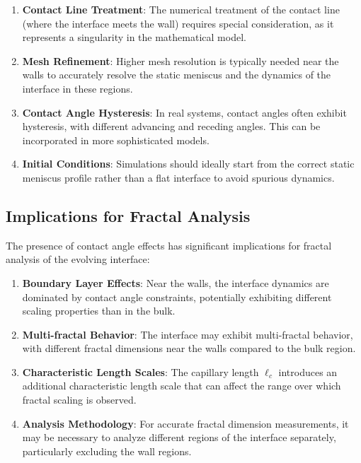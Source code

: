 \documentclass[12pt,a4paper]{article}
\begin{document}
\begin{enumerate}
    \item \textbf{Contact Line Treatment}: The numerical treatment of the contact line (where the interface meets the wall) requires special consideration, as it represents a singularity in the mathematical model.
    
    \item \textbf{Mesh Refinement}: Higher mesh resolution is typically needed near the walls to accurately resolve the static meniscus and the dynamics of the interface in these regions.
    
    \item \textbf{Contact Angle Hysteresis}: In real systems, contact angles often exhibit hysteresis, with different advancing and receding angles. This can be incorporated in more sophisticated models.
    
    \item \textbf{Initial Conditions}: Simulations should ideally start from the correct static meniscus profile rather than a flat interface to avoid spurious dynamics.
\end{enumerate}

\subsection{Implications for Fractal Analysis}
The presence of contact angle effects has significant implications for fractal analysis of the evolving interface:

\begin{enumerate}
    \item \textbf{Boundary Layer Effects}: Near the walls, the interface dynamics are dominated by contact angle constraints, potentially exhibiting different scaling properties than in the bulk.
    
    \item \textbf{Multi-fractal Behavior}: The interface may exhibit multi-fractal behavior, with different fractal dimensions near the walls compared to the bulk region.
    
    \item \textbf{Characteristic Length Scales}: The capillary length $\ell_c$ introduces an additional characteristic length scale that can affect the range over which fractal scaling is observed.
    
    \item \textbf{Analysis Methodology}: For accurate fractal dimension measurements, it may be necessary to analyze different regions of the interface separately, particularly excluding the wall regions.
\end{enumerate}
\end{document}
